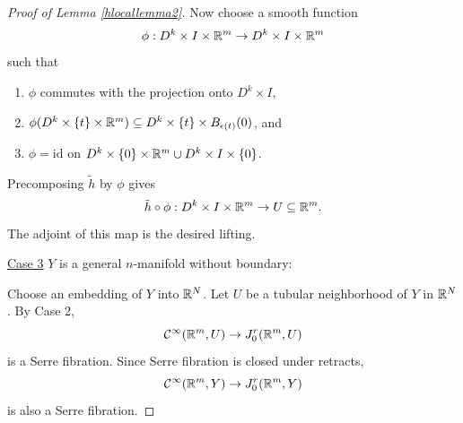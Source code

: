 \documentclass{article}
\newtheorem{proposed work}[theorem]{Proposed Work}
\begin{document}
\begin{proof}[Proof of Lemma \ref{hlocallemma2}]
Now choose a smooth function
\begin{equation*}
\phi: D^k \times I \times \mathbb R^m \to D^k \times I \times \mathbb R^m
\end{equation*}
such that
\begin{enumerate}
\item $\phi$ commutes with the projection onto $D^k\times I$,
\item
$\phi(D^k \times \{t\} \times \mathbb R^m) \subseteq D^k \times \{t\} \times
B_{\epsilon(t)}(0)$, and
\item $\phi = \mathrm{id}$ on
$D^k\times\{0\}\times\mathbb R^m \cup D^k\times I \times\{0\}$.
\end{enumerate}

Precomposing $\tilde{h}$ by $\phi$ gives
\begin{equation*}
\tilde{h} \circ \phi: D^k \times I \times \mathbb R^m \to U \subseteq \mathbb R^m.
\end{equation*}
The adjoint of this map is the desired lifting.
\newline

\noindent\underline{Case 3} $Y$ is a general $n$-manifold without
boundary:
\newline

Choose an embedding of $Y$ into $\mathbb R^N$. Let $U$ be a tubular
neighborhood of $Y$ in $\mathbb R^N$. By Case 2,
\begin{equation*}
\mathcal C^\infty(\mathbb R^m, U) \to J_0^r(\mathbb R^m,U)
\end{equation*}
is a Serre fibration. Since Serre fibration is closed under
retracts,
\begin{equation*}
\mathcal C^\infty(\mathbb R^m, Y) \to J_0^r(\mathbb R^m,Y)
\end{equation*}
is also a Serre fibration.
\end{proof}
\end{document}
